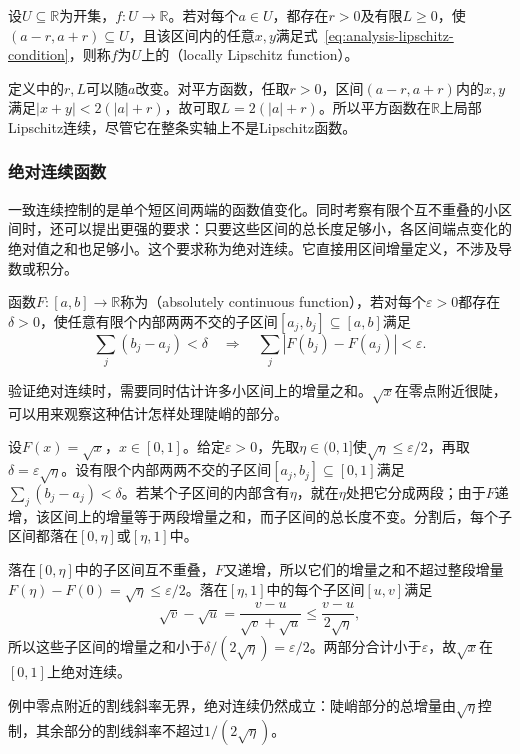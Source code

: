 \begin{definition}[局部Lipschitz连续函数]
\label{def:analysis-local-lipschitz}
设$U\subseteq\mathbb R$为开集，$f:U\to\mathbb R$。若对每个$a\in U$，都存在$r>0$及有限$L\geq0$，使$(a-r,a+r)\subseteq U$，且该区间内的任意$x,y$满足式~\eqref{eq:analysis-lipschitz-condition}，则称$f$为$U$上的（locally Lipschitz function）。
\end{definition}
定义中的$r,L$可以随$a$改变。对平方函数，任取$r>0$，区间$(a-r,a+r)$内的$x,y$满足$|x+y|<2(|a|+r)$，故可取$L=2(|a|+r)$。所以平方函数在$\mathbb R$上局部Lipschitz连续，尽管它在整条实轴上不是Lipschitz函数。

\subsubsection{绝对连续函数}
一致连续控制的是单个短区间两端的函数值变化。同时考察有限个互不重叠的小区间时，还可以提出更强的要求：只要这些区间的总长度足够小，各区间端点变化的绝对值之和也足够小。这个要求称为绝对连续。它直接用区间增量定义，不涉及导数或积分。
\begin{definition}[绝对连续函数]
\label{def:measurable-absolutely-continuous-function}
函数$F:[a,b]\to\mathbb R$称为（absolutely continuous function），若对每个$\varepsilon>0$都存在$\delta>0$，使任意有限个内部两两不交的子区间$[a_j,b_j]\subseteq[a,b]$满足
\[
 \sum_j(b_j-a_j)<\delta
 \quad\Longrightarrow\quad
 \sum_j|F(b_j)-F(a_j)|<\varepsilon.
\]
\end{definition}
验证绝对连续时，需要同时估计许多小区间上的增量之和。$\sqrt x$在零点附近很陡，可以用来观察这种估计怎样处理陡峭的部分。
\begin{example}
\label{ex:analysis-sqrt-absolutely-continuous}
设$F(x)=\sqrt x$，$x\in[0,1]$。给定$\varepsilon>0$，先取$\eta\in(0,1]$使$\sqrt\eta\leq\varepsilon/2$，再取$\delta=\varepsilon\sqrt\eta$。设有限个内部两两不交的子区间$[a_j,b_j]\subseteq[0,1]$满足$\sum_j(b_j-a_j)<\delta$。若某个子区间的内部含有$\eta$，就在$\eta$处把它分成两段；由于$F$递增，该区间上的增量等于两段增量之和，而子区间的总长度不变。分割后，每个子区间都落在$[0,\eta]$或$[\eta,1]$中。

落在$[0,\eta]$中的子区间互不重叠，$F$又递增，所以它们的增量之和不超过整段增量$F(\eta)-F(0)=\sqrt\eta\leq\varepsilon/2$。落在$[\eta,1]$中的每个子区间$[u,v]$满足
\[
 \sqrt v-\sqrt u=\frac{v-u}{\sqrt v+\sqrt u}\leq\frac{v-u}{2\sqrt\eta},
\]
所以这些子区间的增量之和小于$\delta/(2\sqrt\eta)=\varepsilon/2$。两部分合计小于$\varepsilon$，故$\sqrt x$在$[0,1]$上绝对连续。
\end{example}
例中零点附近的割线斜率无界，绝对连续仍然成立：陡峭部分的总增量由$\sqrt\eta$控制，其余部分的割线斜率不超过$1/(2\sqrt\eta)$。

